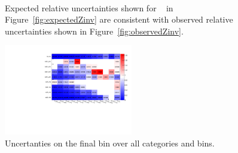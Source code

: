 \begin{figure}[h!]
  \centering
  ~~
  \\
  \caption{\label{fig:expectedObservedZinv}Expected relative uncertainties shown for \zInv~ in Figure~\ref{fig:expectedZinv} are consistent
  with observed relative uncertainties shown in Figure~\ref{fig:observedZinv}.}
\end{figure}

\begin{figure}[]
  \centering
  \includegraphics[width=0.5\textwidth]{figures/template/frenchFlagLastBin.pdf}
  \caption{\label{fig:frenchFlagLastBin} Uncertanties on the final bin
over all categories and \scalht bins.}
\end{figure}

